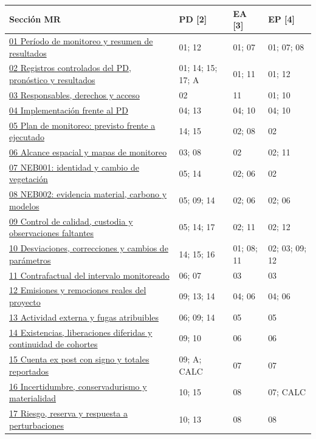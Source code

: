 {\sffamily\fontsize{8.2}{10.2}\selectfont\begin{longtable}{@{}P{83mm}P{26mm}P{24mm}P{24mm}@{}}\toprule
Sección MR & PD [2] & EA [3] & EP [4]\\\midrule\endhead
\hyperref[mr:01]{01 Período de monitoreo y resumen de resultados} & 01; 12 & 01; 07 & 01; 07; 08\\\hline
\hyperref[mr:02]{02 Registros controlados del PD, pronóstico y resultados} & 01; 14; 15; 17; A & 01; 11 & 01; 12\\\hline
\hyperref[mr:03]{03 Responsables, derechos y acceso} & 02 & 11 & 01; 10\\\hline
\hyperref[mr:04]{04 Implementación frente al PD} & 04; 13 & 04; 10 & 04; 10\\\hline
\hyperref[mr:05]{05 Plan de monitoreo: previsto frente a ejecutado} & 14; 15 & 02; 08 & 02\\\hline
\hyperref[mr:06]{06 Alcance espacial y mapas de monitoreo} & 03; 08 & 02 & 02; 11\\\hline
\hyperref[mr:07]{07 NEB001: identidad y cambio de vegetación} & 05; 14 & 02; 06 & 02\\\hline
\hyperref[mr:08]{08 NEB002: evidencia material, carbono y modelos} & 05; 09; 14 & 02; 06 & 02; 06\\\hline
\hyperref[mr:09]{09 Control de calidad, custodia y observaciones faltantes} & 05; 14; 17 & 02; 11 & 02; 12\\\hline
\hyperref[mr:10]{10 Desviaciones, correcciones y cambios de parámetros} & 14; 15; 16 & 01; 08; 11 & 02; 03; 09; 12\\\hline
\hyperref[mr:11]{11 Contrafactual del intervalo monitoreado} & 06; 07 & 03 & 03\\\hline
\hyperref[mr:12]{12 Emisiones y remociones reales del proyecto} & 09; 13; 14 & 04; 06 & 04; 06\\\hline
\hyperref[mr:13]{13 Actividad externa y fugas atribuibles} & 06; 09; 14 & 05 & 05\\\hline
\hyperref[mr:14]{14 Existencias, liberaciones diferidas y continuidad de cohortes} & 09; 10 & 06 & 06\\\hline
\hyperref[mr:15]{15 Cuenta ex post con signo y totales reportados} & 09; A; CALC & 07 & 07\\\hline
\hyperref[mr:16]{16 Incertidumbre, conservadurismo y materialidad} & 10; 15 & 08 & 07; CALC\\\hline
\hyperref[mr:17]{17 Riesgo, reserva y respuesta a perturbaciones} & 10; 13 & 08 & 08\\\hline

\end{longtable}}
